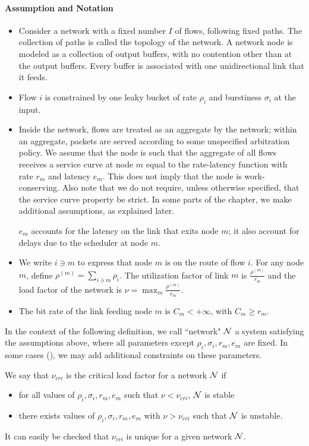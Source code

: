 \paragraph{Assumption and Notation}
\begin{itemize}
  \item Consider a network with a fixed number $I$ of flows, following
fixed paths. The collection of paths is called the topology of the network. A network node is
modeled as a collection of output buffers, with no contention other than at the output buffers.
Every buffer is associated with one unidirectional link that it feeds.

\item Flow $i$ is constrained by one leaky bucket of rate $\rho_i$
and burstiness $\sigma_i$ at the input.
\item Inside the network, flows are treated as an aggregate by the
network; within an aggregate, packets are served according to some unspecified arbitration
policy. We assume that the node is such that the aggregate of all flows receives a service curve
at node $m$ equal to the rate-latency function with rate $r_m$ and latency $e_m$. This does not
imply that the node is work-conserving. Also note that we do not require, unless otherwise
specified, that the service curve property be strict. In some parts of the chapter, we make
additional assumptions, as explained later.

$e_m$ accounts for the latency on the link that exits node $m$; it also account for delays due
to the scheduler at node $m$.

  \item We write $i \ni m$ to express that node $m$ is on the route of
flow $i$. For any node  $m$, define $\rho^{(m)} = \sum_{i \ni m} \rho_i$. The utilization factor
of link $m$ is $\frac{\rho^{(m)}}{r_m}$ and the load factor of the network is $\nu = \max_m
\frac{\rho^{(m)}}{r_m}$.

\item  The bit rate of the link feeding node $m$ is $C_{m} < + \infty$, with $C_m \geq r_m$.
\end{itemize}


In the context of the following definition, we call ``network" $\mathcal N$ a system satisfying the
assumptions above, where all parameters except $\rho_i, \sigma_i, r_m, e_m$ are fixed. In some
cases (), we may add additional constraints on these parameters.
\begin{definition}
We say that $\nu_{cri}$ is the critical load factor for a network
$\mathcal N$ if
\begin{itemize}
  \item for all values of $\rho_i, \sigma_i, r_m, e_m$ such that
  $\nu < \nu_{cri}$, $\mathcal N$ is stable
  \item there exists values of $\rho_i, \sigma_i, r_m, e_m$ with $\nu > \nu_{cri}$ such
  that $\mathcal N$ is unstable.
\end{itemize}
\end{definition}
It can easily be checked that $\nu_{cri}$ is unique for a given
network $\mathcal N$.


